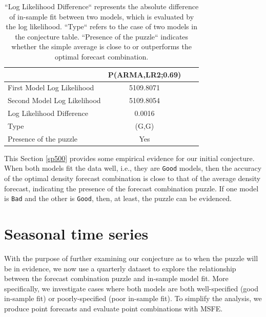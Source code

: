 \documentclass{monashthesis}
\begin{document}
\begin{table}[ht]
  \centering
    \begin{tabular}{l|ccc}
    \toprule
                                    &     P(ARMA,LR2;0.69)    \\  
    \midrule
    First Model Log Likelihood      &         5109.8071       \\
    Second Model Log Likelihood     &         5109.8054       \\
    Log Likelihood Difference       &          0.0016         \\
    Type                            &          (G,G)          \\
    Presence of the puzzle          &           Yes           \\
    \bottomrule
    \end{tabular}
  \caption{``Log Likelihood Difference`` represents the absolute difference of in-sample fit between two models, which is evaluated by the log likelihood. ``Type`` refers to the case of two models in the conjecture table. ``Presence of the puzzle`` indicates whether the simple average is close to or outperforms the optimal forecast combination.}
  \label{tab:statfit}
\end{table}

This Section \ref{sp500} provides some empirical evidence for our initial conjecture. When both models fit the data well, i.e., they are \texttt{Good} models, then the accuracy of the optimal density forecast combination is close to that of the average density forecast, indicating the presence of the forecast combination puzzle. If one model is \texttt{Bad} and the other is \texttt{Good}, then, at least, the puzzle can be evidenced.

\hypertarget{seasonal-time-series}{%
\section{Seasonal time series}\label{seasonal-time-series}}

With the purpose of further examining our conjecture as to when the puzzle will be in evidence, we now use a quarterly dataset to explore the relationship between the forecast combination puzzle and in-sample model fit. More specifically, we investigate cases where both models are both well-specified (good in-sample fit) or poorly-specified (poor in-sample fit). To simplify the analysis, we produce point forecasts and evaluate point combinations with MSFE.
\end{document}
